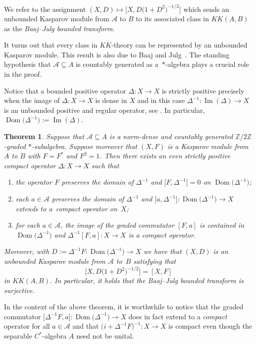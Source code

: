 \documentclass[11pt]{article}
\numberwithin{equation}{section}
\newtheorem{Theorem}{Theorem}[section]
\newcommand{\zz}{\mathbb{Z}}
\newcommand{\De}{\Delta}
\newcommand{\s}[1]{\mathscr{#1}}
\newcommand{\su}{\subseteq}
\begin{document}
We refer to the assignment $(X,D) \mapsto \big[ X, D\big(1 + D^2\big)^{-1/2}\big]$ which sends an unbounded Kasparov module from $\s A$ to $B$ to its associated class in $KK(A,B)$ as the \emph{Baaj--Julg bounded transform}.

It turns out that every class in $KK$-theory can be represented by an unbounded Kasparov module. This result is also due to Baaj and Julg~\cite{BaJu:TBK}. The standing hypothesis that $\s A \su A$ is countably generated as a~$*$-algebra plays a crucial role in the proof.

Notice that a bounded positive operator $\De\colon X \to X$ is strictly positive precisely when the image of $\De\colon X \to X$ is dense in $X$ and in this case $\De^{-1}\colon \operatorname{Im}(\De) \to X$ is an unbounded positive and regular operator, see \cite[Lemma~10.1]{Lan:HCM}. In particular, $\operatorname{Dom}\big(\De^{-1}\big) := \operatorname{Im}(\De)$.

\begin{Theorem}\label{t:bousur}
Suppose that $\s A \su A$ is a norm-dense and countably generated $\zz/2\zz$-graded $*$-subalgebra. Suppose moreover that $(X,F)$ is a Kasparov module from $A$ to $B$ with $F = F^*$ and $F^2 = 1$. Then there exists an even strictly positive compact operator $\De\colon X \to X$ such that
\begin{enumerate}\itemsep=0pt
\item[$1)$] the operator $F$ preserves the domain of $\De^{-1}$ and $\big[ F, \De^{-1} \big] = 0$ on $\operatorname{Dom}\big(\De^{-1}\big)$;
\item[$2)$] each $a \in \s A$ preserves the domain of $\De^{-1}$ and $\big[a,\De^{-1}\big] \colon \operatorname{Dom}\big(\De^{-1}\big) \to X$ extends to a~compact operator on~$X$;
\item[$3)$] for each $a \in \s A$, the image of the graded commutator $[F,a]$ is contained in $\operatorname{Dom}\big(\De^{-1}\big)$ and $\De^{-1}[F,a]\colon X \to X$ is a compact operator.
\end{enumerate}
Moreover, with $D := \De^{-1} F\colon \operatorname{Dom}\big(\De^{-1}\big) \to X$ we have that $(X, D)$ is an unbounded Kasparov module from $\s A$ to~$B$ satisfying that
\[
\big[ X, D\big(1 + D^2\big)^{-1/2}\big] = [X,F]
\]
in $KK(A,B)$. In particular, it holds that the Baaj--Julg bounded transform is surjective.
\end{Theorem}

In the context of the above theorem, it is worthwhile to notice that the graded commutator $\big[\De^{-1} F,a\big]\colon \operatorname{Dom}\big(\De^{-1}\big) \to X$ does in fact extend to a \emph{compact} operator for all $a \in \s A$ and that $\big(i + \De^{-1} F\big)^{-1}\colon X \to X$ is compact even though the separable $C^*$-algebra $A$ need not be unital.
\end{document}
